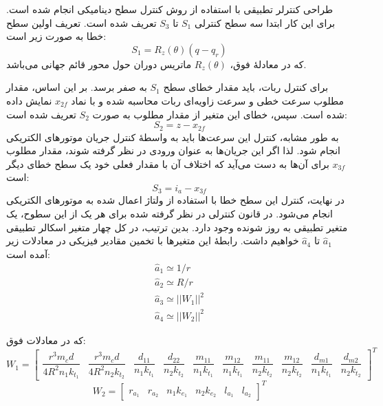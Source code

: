 طراحی کنترلر تطبیقی با استفاده از روش کنترل سطح دینامیکی انجام شده است.
برای این کار ابتدا سه سطح کنترلی $S_1$ تا $S_3$ تعریف شده است. تعریف اولین سطح خطا به صورت زیر است:
\begin{equation}
	S_1 = R_z(\theta) (q - q_r)
\end{equation}
که در معادلهٔ فوق، $R_z(\theta)$ ماتریس دوران حول محور قائم جهانی می‌باشد.

برای کنترل ربات، باید مقدار خطای سطح $S_1$ به صفر برسد.
بر این اساس، مقدار مطلوب سرعت خطی و سرعت زاویه‌ای ربات محاسبه شده و با نماد $x_{2f}$ نمایش داده شده است.
سپس، خطای این متغیر از مقدار مطلوب به صورت $S_2$ تعریف شده است:
\begin{equation}
	S_2 = z - x_{2f}
\end{equation}
به طور مشابه، کنترل این سرعت‌ها باید به واسطهٔ کنترل جریان موتورهای الکتریکی انجام شود.
لذا اگر این جریان‌ها به عنوان ورودی در نظر گرفته شوند، مقدار مطلوب $x_{3f}$ برای آن‌ها به دست می‌آید که اختلاف آن با مقدار فعلی خود یک سطح خطای دیگر است:
\begin{equation}
	S_3 = i_a - x_{3f}
\end{equation}
در نهایت، کنترل این سطح خطا با استفاده از ولتاژ اعمال شده به موتورهای الکتریکی انجام می‌شود.
در قانون کنترلی در نظر گرفته شده برای هر یک از این سطوح، یک متغیر تطبیقی به روز شونده وجود دارد. بدین ترتیب، در کل چهار متغیر اسکالر تطبیقی
$\hat{a}_1$ تا $\hat{a}_4$
خواهیم داشت.
رابطهٔ این متغیرها با تخمین مقادیر فیزیکی در معادلات زیر آمده است:
\begin{align}
	\hat{a}_1 \simeq 1/r
\\
	\hat{a}_2 \simeq R/r
\\
	\hat{a}_3 \simeq || W_1 ||^2
\\
	\hat{a}_4 \simeq || W_2 ||^2
\end{align}

که در معادلات فوق:
$$
	W_1 = \left[
	\begin{matrix}
		\dfrac{r^3 m_c d}{4R^2n_1k_{t_1}} &
		\dfrac{r^3 m_c d}{4R^2n_2k_{t_2}} &
		\dfrac{d_{11}}{n_1 k_{t_1}} &
		\dfrac{d_{22}}{n_2 k_{t_2}} &
		\dfrac{m_{11}}{n_1 k_{t_1}} &
		\dfrac{m_{12}}{n_1 k_{t_1}} &
		\dfrac{m_{11}}{n_2 k_{t_2}} &
		\dfrac{m_{12}}{n_2 k_{t_2}} &
		\dfrac{d_{m1}}{n_1 k_{t_1}} &
		\dfrac{d_{m2}}{n_2 k_{t_2}}
	\end{matrix}
	\right]^T
$$
$$
W_2 = \left[
\begin{matrix}
	r_{a_1} & r_{a_2} & n_1 k_{e_1} & n_2 k_{e_2} & l_{a_1} & l_{a_2}
\end{matrix}
\right]^T
$$

